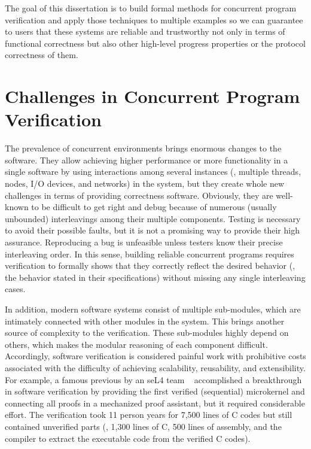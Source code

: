 The goal of this dissertation is to build formal methods for concurrent program verification and apply those techniques to 
multiple examples so we can guarantee to users that these systems are reliable and trustworthy not only in terms of functional correctness 
but also other high-level progress properties or the protocol correctness of them.


\section{Challenges in Concurrent Program Verification}
\label{chapter:introduction:sec:challenges-in-concurrent-program-verification}




The prevalence of concurrent environments brings enormous changes to the software. 
They allow  achieving higher performance or more functionality in a single software by using interactions among several instances 
(\ie, multiple threads, nodes, I/O devices, and networks) in the system, 
but they create whole new challenges in terms of providing correctness software. 
Obviously, they are well-known to be difficult to get right and debug because of numerous (usually unbounded)
 interleavings among their multiple components. Testing is necessary to avoid their possible faults, 
 but it is not a promising way to provide their high assurance. Reproducing a bug is unfeasible unless testers know their precise interleaving order.
In this sense, building reliable concurrent programs requires verification to formally shows that they 
correctly reflect the desired behavior (\ie, the behavior stated in their specifications) without missing any single interleaving cases.


In addition, modern software systems consist of multiple sub-modules, 
which are intimately connected with other modules in the system. This brings another source of complexity to the verification. 
These sub-modules highly depend on others, which makes the modular reasoning of each component difficult. 
Accordingly, software verification is considered painful work with prohibitive costs associated with the difficulty of achieving scalability, 
reusability,  and extensibility. 
For example, a famous previous by an seL4 team ~\cite{klein2009sel4} accomplished a breakthrough in software verification 
by providing the first verified (sequential) microkernel and connecting all proofs in a mechanized proof assistant, 
but it required considerable effort. The verification took 11 person years for 7,500 lines of C codes but still contained unverified parts
 (\ie, 1,300 lines of C, 500 lines of assembly, and the compiler to extract the executable code from the verified C codes).


